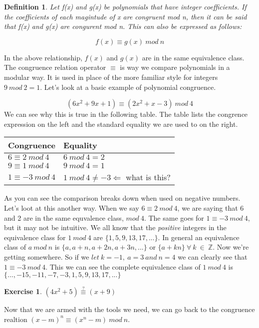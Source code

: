 \documentclass[11pt]{article}
\newtheorem{ex}{Exercise}
\newtheorem{definition}{Definition}
\begin{document}
\begin{definition}
Let f(x) and g(x) be polynomials  that have integer coefficients. If the coefficients of each magintude of x are congruent mod n, then it can be said that f(x) and g(x) are congurent mod n. This can also be expressed as follows:

$$f(x) \equiv g(x)\ mod\ n$$
 
\end{definition}

In the above relationship, $f(x)$ and $g(x)$ are in the same equivalence class. The congruence relation operator $\equiv$ is way we compare polynomials in a modular way. It is used in place of the more familiar style for integers $ 9\ mod\ 2 = 1 $. Let's look at a basic example of polynomial congruence.

$$(6x^2+9x+1) \equiv (2x^2+x-3)\ mod\ 4$$ We can see why this is true in the following table. The table lists the congrence expression on the left and the standard equality we are used to on the right. 

\begin{center}
    \begin{tabular}{ | l | l |}
    \hline
	Congruence & Equality \\ \hline
	$ 6 \equiv 2\ mod\ 4 $ & $6\ mod\ 4=2$\\ \hline
	$ 9 \equiv 1\ mod\ 4 $ & $9\ mod\ 4=1$\\ \hline
	$ 1 \equiv -3\ mod\ 4 $ & $1\ mod\ 4\not=-3\Leftarrow$ what is this?\\ \hline
    \end{tabular}
\end{center}

As you can see the comparison breaks down when used on negative numbers. Let's loot at this another way. When we say $6 \equiv 2\ mod\ 4$, we are saying that 6 and 2 are in the same equvalence class, $mod\ 4$. The same goes for $1 \equiv-3\ mod\ 4$, but it may not be intuitive. We all know that the \emph{positive} integers in the equivalence class for $1\ mod\ 4$ are $\{1,5,9,13,17,...\}$. In general an equivalence class of $a\ mod\ n$ is $\{a,a+n,a+2n,a+3n,...\}$ or $\{a+kn\}\ \forall\ k\ \in\ \mathbb{Z}$. Now we're getting somewhere. So if we $let\ k = -1,\ a = 3\ and\ n = 4$ we can clearly see that $1 \equiv -3\ mod\ 4$. This we can see the complete equivalence class of $1\ mod\ 4$ is $\{...,-15,-11,-7,-3,1,5,9,13,17,...\}$

\begin{ex}
$(4x^2+5) \stackrel{?}{\equiv} (x+9)$
\end{ex}
\vspace{10pc}
Now that we are armed with the tools we need, we can go back to the congruence realtion $(x-m)^n \equiv (x^n -m)\ mod\ n$.
\end{document}
